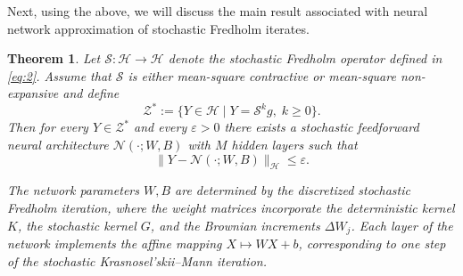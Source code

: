 \documentclass[preprint,12pt,authoryear]{elsarticle}
\newtheorem{theorem}{Theorem}
\begin{document}
Next, using the above, we will discuss the main result associated with neural network approximation of stochastic Fredholm iterates.
\begin{theorem}
Let $\mathcal{S}:\mathcal{H}\to\mathcal{H}$ denote the stochastic Fredholm operator 
defined in \eqref{eq:2}. Assume that $\mathcal{S}$ is either mean-square 
contractive or mean-square non-expansive and define
\[
\mathcal{Z}^{\ast}
:=
\{Y\in\mathcal{H} \mid Y=\mathcal{S}^{k}g,\; k\ge0\}.
\]
Then for every $Y\in\mathcal{Z}^{\ast}$ and every $\varepsilon>0$ there exists 
a stochastic feedforward neural architecture 
$\mathcal{N}(\cdot;W,B)$ with $M$ hidden layers such that
\[
\|Y-\mathcal{N}(\cdot;W,B)\|_{\mathcal{H}}
\le \varepsilon .
\]

The network parameters $W,B$ are determined by the discretized stochastic 
Fredholm iteration, where the weight matrices incorporate the deterministic 
kernel $K$, the stochastic kernel $G$, and the Brownian increments 
$\Delta W_j$. Each layer of the network implements the affine mapping 
$X\mapsto WX+b$, corresponding to one step of the stochastic 
Krasnosel'skii--Mann iteration.
\end{theorem}
\end{document}
